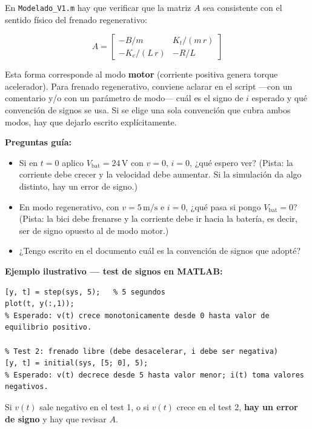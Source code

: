 \documentclass[11pt,a4paper]{article}
\newcommand{\unit}[1]{\,\mathrm{#1}}
\begin{document}
En \texttt{Modelado\_V1.m} hay que verificar que la matriz $A$ sea consistente con el sentido físico del frenado regenerativo:

\begin{equation}
A = \begin{bmatrix}
-B/m & K_t/(m\,r) \\
-K_e/(L\,r) & -R/L
\end{bmatrix}
\end{equation}

Esta forma corresponde al modo \textbf{motor} (corriente positiva genera torque acelerador). Para frenado regenerativo, conviene aclarar en el script ---con un comentario y/o con un parámetro de modo--- cuál es el signo de $i$ esperado y qué convención de signos se usa. Si se elige una sola convención que cubra ambos modos, hay que dejarlo escrito explícitamente.

\begin{guia}
\textbf{Preguntas guía:}
\begin{itemize}
    \item Si en $t=0$ aplico $V_{\text{bat}} = 24\unit{V}$ con $v=0,\,i=0$, ¿qué espero ver? (Pista: la corriente debe crecer y la velocidad debe aumentar. Si la simulación da algo distinto, hay un error de signo.)
    \item En modo regenerativo, con $v=5\unit{m/s}$ e $i=0$, ¿qué pasa si pongo $V_{\text{bat}}=0$? (Pista: la bici debe frenarse y la corriente debe ir hacia la batería, es decir, ser de signo opuesto al de modo motor.)
    \item ¿Tengo escrito en el documento cuál es la convención de signos que adopté?
\end{itemize}
\end{guia}

\begin{ejemplo}
\textbf{Ejemplo ilustrativo --- test de signos en MATLAB:}

\begin{lstlisting}[style=matlab]
% Test 1: respuesta al escalon en modo motor (debe acelerar)
[y, t] = step(sys, 5);   % 5 segundos
plot(t, y(:,1));
% Esperado: v(t) crece monotonicamente desde 0 hasta valor de equilibrio positivo.

% Test 2: frenado libre (debe desacelerar, i debe ser negativa)
[y, t] = initial(sys, [5; 0], 5);
% Esperado: v(t) decrece desde 5 hasta valor menor; i(t) toma valores negativos.
\end{lstlisting}

Si $v(t)$ sale negativo en el test 1, o si $v(t)$ crece en el test 2, \textbf{hay un error de signo} y hay que revisar $A$.
\end{ejemplo}
\end{document}
